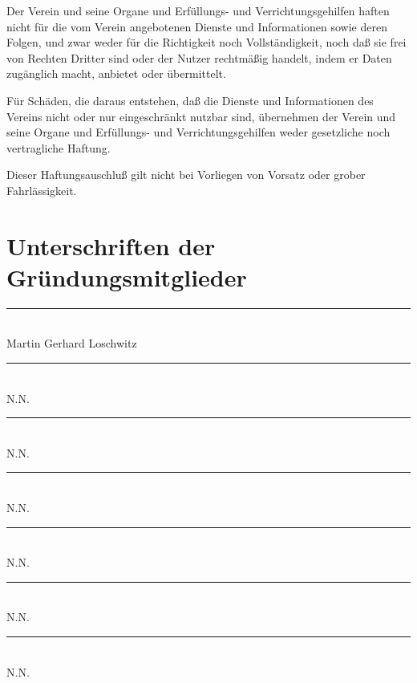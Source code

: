 \documentclass[draft]{scrartcl}
\begin{document}
\begin{contract}
Der Verein und seine Organe und Erfüllungs- und Verrichtungsgehilfen haften
nicht für die vom Verein angebotenen Dienste und Informationen sowie deren
Folgen, und zwar weder für die Richtigkeit noch Vollständigkeit, noch daß sie
frei von Rechten Dritter sind oder der Nutzer rechtmäßig handelt, indem er
Daten zugänglich macht, anbietet oder übermittelt.

Für Schäden, die daraus entstehen, daß die Dienste und Informationen des
Vereins nicht oder nur eingeschränkt nutzbar sind, übernehmen der Verein und
seine Organe und Erfüllungs- und Verrichtungsgehilfen weder gesetzliche noch
vertragliche Haftung.

Dieser Haftungsauschluß gilt nicht bei Vorliegen von Vorsatz oder grober
Fahr\-läss\-ig\-keit.

\end{contract}

\pagebreak\section*{Unterschriften der Gründungsmitglieder}

\vspace{3em}

\rule{6cm}{0.4pt} \\
\noindent Martin Gerhard Loschwitz \\
\vspace{2em}

\rule{6cm}{0.4pt} \\
\noindent N.N. \\
\vspace{2em}

\rule{6cm}{0.4pt} \\
\noindent N.N. \\
\vspace{2em}

\rule{6cm}{0.4pt} \\
\noindent N.N. \\
\vspace{2em}

\rule{6cm}{0.4pt} \\
\noindent N.N. \\
\vspace{2em}

\rule{6cm}{0.4pt} \\
\noindent N.N. \\
\vspace{2em}

\rule{6cm}{0.4pt} \\
\noindent N.N.
\end{document}

